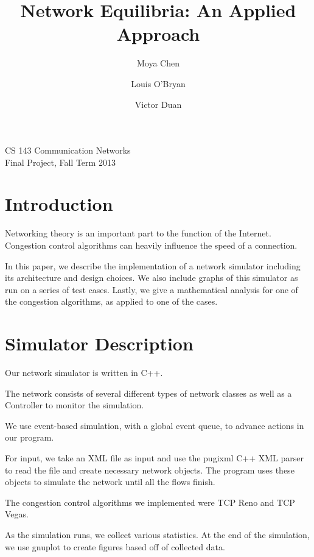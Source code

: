 \documentclass{article}
\title{Network Equilibria: An Applied Approach}
\author{Moya Chen \and Louis O'Bryan \and Victor Duan}
\begin{document}
\begin{titlepage}
    \maketitle
    \vfill
    \begin{center}
        {\large CS 143 Communication Networks \\ Final Project, Fall Term 2013}
    \end{center}
    \vfill
    \thispagestyle{empty}
\end{titlepage}

\tableofcontents
\newpage

\section{Introduction}
Networking theory is an important part to the function of the Internet. Congestion control algorithms can heavily influence the speed of a connection. 

In this paper, we describe the implementation of a network simulator including its architecture and design choices. We also include graphs of this simulator as run on a series of test cases. Lastly, we give a mathematical analysis for one of the congestion algorithms, as applied to one of the cases.



\section{Simulator Description}
    Our network simulator is written in C++. 
    
    The network consists of several different types of network classes as well as a Controller to monitor the simulation. 
    
    We use event-based simulation, with a global event queue, to advance actions in our program. 
    
    For input, we take an XML file as input and use the pugixml C++ XML parser to read the file and create necessary network objects. The program uses these objects to simulate the network until all the flows finish. 
    
    The congestion control algorithms we implemented were TCP Reno and TCP Vegas.

     As the simulation runs, we collect various statistics. At the end of the simulation, we use gnuplot to create figures based off of collected data.
\end{document}
